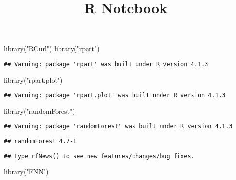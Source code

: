 \documentclass[
]{article}
\title{R Notebook}
\author{}
\date{\vspace{-2.5em}}
\newenvironment{Shaded}{\begin{snugshade}}{\end{snugshade}}
\newcommand{\FunctionTok}[1]{\textcolor[rgb]{0.00,0.00,0.00}{#1}}
\newcommand{\NormalTok}[1]{#1}
\newcommand{\StringTok}[1]{\textcolor[rgb]{0.31,0.60,0.02}{#1}}
\begin{document}
\maketitle

\begin{Shaded}
\begin{Highlighting}[]
\FunctionTok{library}\NormalTok{(}\StringTok{"RCurl"}\NormalTok{)}
\FunctionTok{library}\NormalTok{(}\StringTok{"rpart"}\NormalTok{)}
\end{Highlighting}
\end{Shaded}

\begin{verbatim}
## Warning: package 'rpart' was built under R version 4.1.3
\end{verbatim}

\begin{Shaded}
\begin{Highlighting}[]
\FunctionTok{library}\NormalTok{(}\StringTok{"rpart.plot"}\NormalTok{)}
\end{Highlighting}
\end{Shaded}

\begin{verbatim}
## Warning: package 'rpart.plot' was built under R version 4.1.3
\end{verbatim}

\begin{Shaded}
\begin{Highlighting}[]
\FunctionTok{library}\NormalTok{(}\StringTok{"randomForest"}\NormalTok{)}
\end{Highlighting}
\end{Shaded}

\begin{verbatim}
## Warning: package 'randomForest' was built under R version 4.1.3
\end{verbatim}

\begin{verbatim}
## randomForest 4.7-1
\end{verbatim}

\begin{verbatim}
## Type rfNews() to see new features/changes/bug fixes.
\end{verbatim}

\begin{Shaded}
\begin{Highlighting}[]
\FunctionTok{library}\NormalTok{(}\StringTok{"FNN"}\NormalTok{)}
\end{Highlighting}
\end{Shaded}
\end{document}
